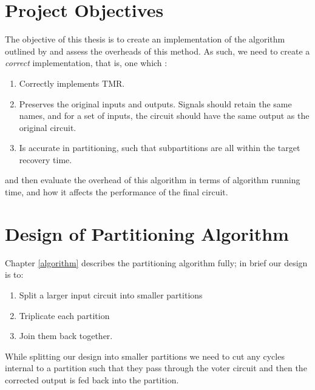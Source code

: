 \documentclass[12pt,final,oneside]{dwThesis} %
\begin{document}
   \section{Project Objectives}
   \label{secObjectives}
   The objective of this thesis is to create an implementation of the algorithm
   outlined by \cite{DiesselChange} and assess the overheads of this method.  As
   such, we need to create a \textit{correct} implementation, that is, one which
   :
   \begin{enumerate}

      \item Correctly implements TMR.
      \item Preserves the original inputs and outputs. Signals should retain
         the same names, and for a set of inputs, the circuit should have
         the same output as the original circuit.
      \item Is accurate in partitioning, such that subpartitions are all
         within the target recovery time.  
   \end{enumerate}
   and then
   evaluate the overhead of this algorithm in terms of algorithm running
   time, and how it affects the performance of the final circuit.

   \section{Design of Partitioning Algorithm} \label{DesignEstimates}
    Chapter \ref{algorithm} describes the partitioning algorithm fully; in brief our design is to:
    \begin{enumerate}
    	\item Split a larger input circuit into smaller partitions
    	\item Triplicate each partition
    	\item Join them back together.
\end{enumerate}
    While splitting our design into smaller partitions we need to cut any cycles internal to a partition such that they pass through
    the voter circuit and then the corrected output is fed back into the partition.
    
\end{document}

